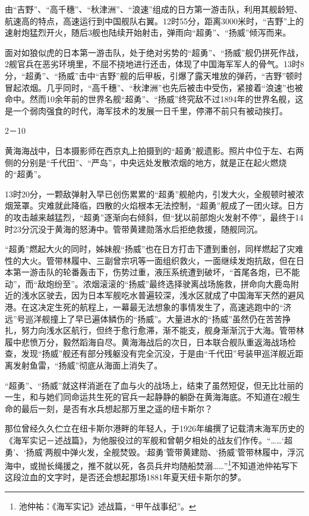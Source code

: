 \documentclass[12pt,UTF8]{ctexbook}
\begin{document}
由“吉野”、“高千穗”、“秋津洲”、“浪速”组成的日方第一游击队，利用其舰龄短、航速高的特点，高速运行到中国舰队右翼。12时55分，距离3000米时，“吉野”上的速射炮猛烈开火，随后3舰也陆续开始射击，弹雨向“超勇”、“扬威”倾泻而来。

面对如狼似虎的日本第一游击队，处于绝对劣势的“超勇”、“扬威”舰仍拼死作战，2舰官兵在恶劣环境里，不屈不挠地进行还击，体现了中国海军军人的骨气。13时8分，“超勇”、“扬威”击中“吉野”舰的后甲板，引爆了露天堆放的弹药，“吉野”顿时冒起浓烟。几乎同时，“高千穗”、“秋津洲”也先后被击中受伤，紧接着“浪速”也被命中。然而10余年前的世界名舰“超勇”、“扬威”终究敌不过1894年的世界名舰，这是一个弱肉强食的时代，海军技术的发展一日千里，停滞不前只有被动挨打。

2－10

黄海海战中，日本摄影师在西京丸上拍摄到的“超勇”舰遗影。照片中位于左、右两侧的分别是“千代田”、“严岛”，中央远处发散浓烟的地方，就是正在起火燃烧的“超勇”。

13时20分，一颗敌弹射入早已创伤累累的“超勇”舰舱内，引发大火，全舰顿时被浓烟笼罩。灾难就此降临，四散的火焰根本无法控制，“超勇”舰成了一团火球。日方的攻击越来越猛烈，“超勇”逐渐向右倾斜，但“犹以前部炮火发射不停”，最终于14时23分沉没于黄海的怒涛中。管带黄建勋落水后拒绝救援，随舰同沉。

“超勇”燃起大火的同时，姊妹舰“扬威”也在日方打击下遭到重创，同样燃起了灾难性的大火。管带林履中、三副曾宗巩等一面组织救火，一面继续发炮抗敌，但在日本第一游击队的轮番轰击下，伤势过重，液压系统遭到破坏，“首尾各炮，已不能动”，而“敌炮纷至”。浓烟滚滚的“扬威”最终选择驶离战场施救，拼命向大鹿岛附近的浅水区驶去，因为日本军舰吃水普遍较深，浅水区就成了中国海军天然的避风港。在这决定生死的航程上，一幕最无法想象的事情发生了，高速逃跑中的“济远”号巡洋舰撞上了早已遍体鳞伤的“扬威”。大量进水的“扬威”虽然仍在苦苦挣扎，努力向浅水区航行，但终于愈行愈滞，渐不能支，舰身渐渐沉于大海。管带林履中悲愤万分，毅然蹈海自尽。黄海海战后的次日，日本联合舰队重返海战场检查，发现“扬威”舰还有部分残躯没有完全沉没，于是由“千代田”号装甲巡洋舰近距离发射鱼雷，“扬威”彻底从海面上消失了。

“超勇”、“扬威”就这样消逝在了血与火的战场上，结束了虽然短促，但无比壮丽的一生，和与她们同命运共生死的官兵一起静静的躺卧在黄海海底。不知道在2舰生命的最后一刻，是否有水兵想起那万里之遥的纽卡斯尔？

那位曾经久久伫立在纽卡斯尔港畔的年轻人，于1926年编撰了记载清末海军历史的《海军实记－述战篇》，为他服役过的军舰和曾朝夕相处的战友们作传。“……‘超勇’、‘扬威’两舰中弹火发，全舰焚毁。‘超勇’管带黄建勋、‘扬威’管带林履中，浮沉海中，或抛长绳援之，推不就以死，各员兵弁均随船焚溺……”\footnote{池仲祐：《海军实记》述战篇，“甲午战事纪”。}不知道池仲祐写下这段泣血的文字时，是否还会想起那场1881年夏天纽卡斯尔的梦。
\end{document}

